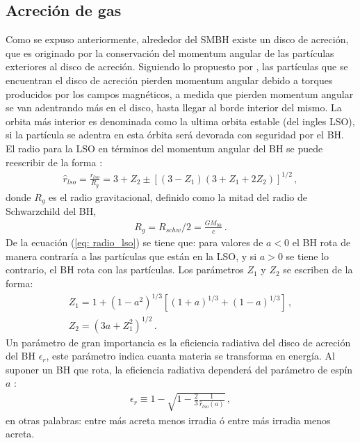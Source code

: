 \subsection{Acreción de gas}
\label{subsec: Acrecion_gas}
Como se expuso anteriormente, alrededor del SMBH existe un disco de acreción, que es originado por la conservación del momentum angular de las partículas exteriores al disco de acreción. Siguiendo lo propuesto por \cite{lynden1969}, las partículas que se encuentran el disco de acreción pierden momentum angular debido a torques producidos por los campos magnéticos, a medida que pierden momentum angular se van adentrando más en el disco, hasta llegar al borde interior del mismo. La orbita más interior es denominada como la ultima orbita estable (del ingles LSO), si la partícula se adentra en esta órbita será devorada con seguridad por el BH. El radio para la LSO en términos del momentum angular del BH se puede reescribir de la forma \cite{bardeen1972}:
%
\begin{align}
 \hat{r}_{lso}=\frac{r_{lso}}{R_g}=3+Z_{2}\pm \left[ (3-Z_{1})(3+Z_{1}+2Z_{2})\right]^{1/2} \,,
 \label{eq: radio_lso}
\end{align}
%
donde $R_{g}$ es el radio gravitacional, definido como la mitad del radio de Schwarzchild del BH, 
%
\begin{align}
    R_{g}= R_{schw}/2  = \frac{GM_{bh}}{c}\,.
\end{align}
%
De la ecuación (\ref{eq: radio_lso}) se tiene que: para valores de $a<0$ el BH rota de manera contraría a las partículas que están en la LSO, y si $a>0$ se tiene lo contrario, el BH rota con las partículas. Los parámetros $Z_1$ y $Z_2$ se escriben de la forma:
%
\begin{eqnarray}
    Z_1 = 1+(1-a^{2})^{1/3}\left[(1+a)^{1/3}+(1-a)^{1/3} \right]\,,\\
    Z_2 = (3a+Z_{1}^{2})^{1/2}\,.
\end{eqnarray}
%
Un parámetro de gran importancia es la eficiencia radiativa del disco de acreción del BH $\epsilon_{r}$, este parámetro indica cuanta materia se transforma en energía. Al suponer un BH que rota, la eficiencia radiativa dependerá del parámetro de espín $a$ \cite{novikov1973}:
%
\begin{align}
    \epsilon_{r} \equiv 1- \sqrt{1-\frac{2}{3}\frac{1}{\hat{r}_{lso}(a)}}\,,
\end{align}
\label{eq: eficiencia radiativa}
%
en otras palabras: entre más acreta menos irradia ó entre más irradia menos acreta.

